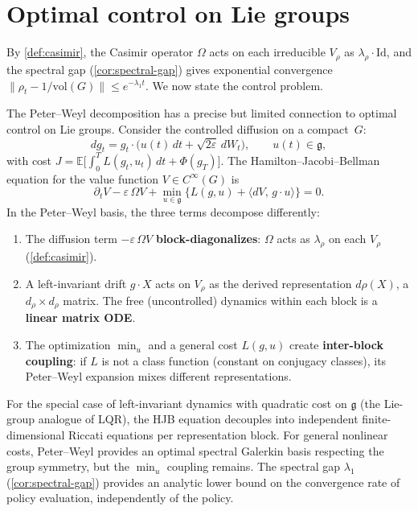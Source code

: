 \section{Optimal control on Lie groups}\label{sec:hjb}

By \cref{def:casimir}, the Casimir operator $\Omega$ acts on each irreducible $V_\rho$ as $\lambda_\rho \cdot \mathrm{Id}$, and the spectral gap (\cref{cor:spectral-gap}) gives exponential convergence $\|\rho_t - 1/\mathrm{vol}(G)\| \leq e^{-\lambda_1 t}$. We now state the control problem.

\begin{remark}
The Peter--Weyl decomposition has a precise but limited connection to optimal control on Lie groups. Consider the controlled diffusion on a compact~$G$:
\[
dg_t = g_t \cdot \bigl(u(t)\, dt + \sqrt{2\varepsilon}\, dW_t\bigr), \qquad u(t) \in \mathfrak{g},
\]
with cost $J = \mathbb{E}\bigl[\int_0^T L(g_t, u_t)\, dt + \Phi(g_T)\bigr]$. The Hamilton--Jacobi--Bellman equation for the value function $V \in C^\infty(G)$ is
\[
\partial_t V - \varepsilon\, \Omega V + \min_{u \in \mathfrak{g}}\bigl\{L(g, u) + \langle dV,\, g \cdot u\rangle\bigr\} = 0.
\]
In the Peter--Weyl basis, the three terms decompose differently:
\begin{enumerate}[label=(\roman*)]
\item The diffusion term $-\varepsilon\, \Omega V$ \textbf{block-diagonalizes}: $\Omega$ acts as $\lambda_\rho$ on each $V_\rho$ (\cref{def:casimir}).
\item A left-invariant drift $g \cdot X$ acts on $V_\rho$ as the derived representation $d\rho(X)$, a $d_\rho \times d_\rho$ matrix. The free (uncontrolled) dynamics within each block is a \textbf{linear matrix ODE}.
\item The optimization $\min_u$ and a general cost $L(g, u)$ create \textbf{inter-block coupling}: if $L$ is not a class function (constant on conjugacy classes), its Peter--Weyl expansion mixes different representations.
\end{enumerate}
For the special case of left-invariant dynamics with quadratic cost on $\mathfrak{g}$ (the Lie-group analogue of LQR), the HJB equation decouples into independent finite-dimensional Riccati equations per representation block. For general nonlinear costs, Peter--Weyl provides an optimal spectral Galerkin basis respecting the group symmetry, but the $\min_u$ coupling remains. The spectral gap $\lambda_1$ (\cref{cor:spectral-gap}) provides an analytic lower bound on the convergence rate of policy evaluation, independently of the policy.
\end{remark}

